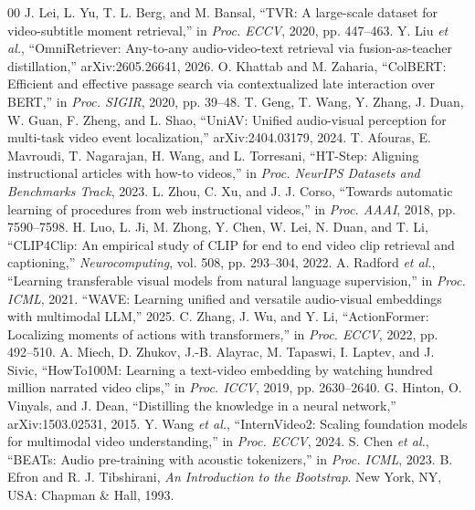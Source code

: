 \documentclass{IEEEtran}
\begin{document}
\begin{thebibliography}{00}
 J. Lei, L. Yu, T. L. Berg, and M. Bansal, ``TVR: A large-scale dataset for video-subtitle moment retrieval,'' in \textit{Proc. ECCV}, 2020, pp. 447--463.
 Y. Liu \textit{et al.}, ``OmniRetriever: Any-to-any audio-video-text retrieval via fusion-as-teacher distillation,'' arXiv:2605.26641, 2026.
 O. Khattab and M. Zaharia, ``ColBERT: Efficient and effective passage search via contextualized late interaction over BERT,'' in \textit{Proc. SIGIR}, 2020, pp. 39--48.
 T. Geng, T. Wang, Y. Zhang, J. Duan, W. Guan, F. Zheng, and L. Shao, ``UniAV: Unified audio-visual perception for multi-task video event localization,'' arXiv:2404.03179, 2024.
 T. Afouras, E. Mavroudi, T. Nagarajan, H. Wang, and L. Torresani, ``HT-Step: Aligning instructional articles with how-to videos,'' in \textit{Proc. NeurIPS Datasets and Benchmarks Track}, 2023.
 L. Zhou, C. Xu, and J. J. Corso, ``Towards automatic learning of procedures from web instructional videos,'' in \textit{Proc. AAAI}, 2018, pp. 7590--7598.
 H. Luo, L. Ji, M. Zhong, Y. Chen, W. Lei, N. Duan, and T. Li, ``CLIP4Clip: An empirical study of CLIP for end to end video clip retrieval and captioning,'' \textit{Neurocomputing}, vol. 508, pp. 293--304, 2022.
 A. Radford \textit{et al.}, ``Learning transferable visual models from natural language supervision,'' in \textit{Proc. ICML}, 2021.
 ``WAVE: Learning unified and versatile audio-visual embeddings with multimodal LLM,'' 2025.
 C. Zhang, J. Wu, and Y. Li, ``ActionFormer: Localizing moments of actions with transformers,'' in \textit{Proc. ECCV}, 2022, pp. 492--510.
 A. Miech, D. Zhukov, J.-B. Alayrac, M. Tapaswi, I. Laptev, and J. Sivic, ``HowTo100M: Learning a text-video embedding by watching hundred million narrated video clips,'' in \textit{Proc. ICCV}, 2019, pp. 2630--2640.
 G. Hinton, O. Vinyals, and J. Dean, ``Distilling the knowledge in a neural network,'' arXiv:1503.02531, 2015.
 Y. Wang \textit{et al.}, ``InternVideo2: Scaling foundation models for multimodal video understanding,'' in \textit{Proc. ECCV}, 2024.
 S. Chen \textit{et al.}, ``BEATs: Audio pre-training with acoustic tokenizers,'' in \textit{Proc. ICML}, 2023.
 B. Efron and R. J. Tibshirani, \textit{An Introduction to the Bootstrap}. New York, NY, USA: Chapman \& Hall, 1993.
\end{thebibliography}
\end{document}

